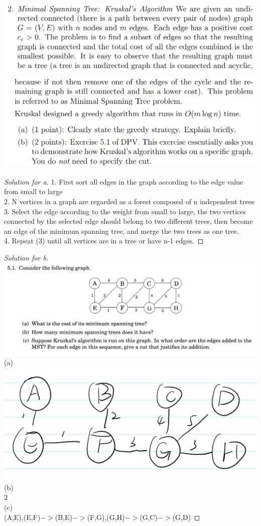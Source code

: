 \documentclass[12pt]{article}
\begin{document}
\includegraphics[scale=0.39]{2_1.png}\\
\includegraphics[scale=0.39]{2_2.png}
\begin{proof}[Solution for a]
	1. First sort all edges in the graph according to the edge value from small to large\\
	2. N vertices in a graph are regarded as a forest composed of n independent trees\\
	3. Select the edge according to the weight from small to large, the two vertices connected by the selected edge should belong to two different trees, then become an edge of the minimum spanning tree, and merge the two trees as one tree.\\
	4. Repeat (3) until all vertices are in a tree or have n-1 edges.
\end{proof}
\begin{proof}[Solution for b]
	\ \\
	\includegraphics[scale=0.38]{2_3.png}
	(a)\\
	\includegraphics[scale=0.3]{2_4.png}\\
	(b)\\
	2\\
	(c)\\
	(A,E),(E,F)$->$(B,E)$->$(F,G),(G,H)$->$(G,C)$->$(G,D)
\end{proof}
\end{document}
